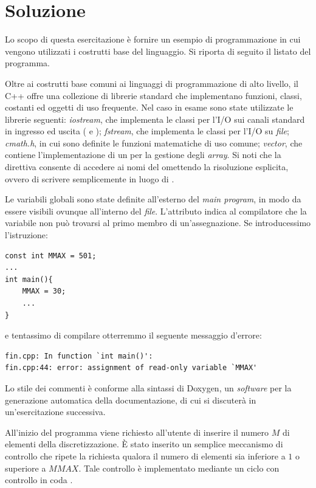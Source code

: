 \newpage
\section*{Soluzione}

Lo scopo di questa esercitazione \`e fornire un esempio di
programmazione in cui vengono utilizzati i costrutti base del
linguaggio. Si riporta di seguito il listato del programma.
\lstset{basicstyle=\scriptsize\sf}

\lstset{basicstyle=\sf}

Oltre ai costrutti base comuni ai linguaggi di programmazione di alto
livello, il C++ offre una collezione di librerie standard che
implementano funzioni, classi, costanti ed oggetti di uso
frequente. Nel caso in esame sono state utilizzate le librerie
seguenti: \emph{iostream}, che implementa le classi per l'I/O sui
canali standard in ingresso ed uscita ( e
); \emph{fstream}, che implementa le classi per
l'I/O su \emph{file}; \emph{cmath.h}, in cui sono definite le funzioni
matematiche di uso comune; \emph{vector}, che contiene
l'implementazione di un   per la
gestione degli \emph{array}. Si noti che la direttiva   consente di accedere ai nomi del 
 omettendo la risoluzione esplicita, ovvero di scrivere
semplicemente  in luogo di .

Le variabili globali sono state definite all'esterno del \emph{main
program}, in modo da essere visibili ovunque all'interno del
\emph{file}. L'attributo  indica al compilatore che la
variabile non pu\`o trovarsi al primo membro di un'assegnazione. Se
introducessimo l'istruzione: 
\lstset{basicstyle=\scriptsize\sf}
\begin{lstlisting}
const int MMAX = 501;
...
int main(){     
    MMAX = 30;
    ...
}
\end{lstlisting}
\lstset{basicstyle=\sf}
e tentassimo di compilare otterremmo il seguente messaggio d'errore:
\begin{verbatim}
fin.cpp: In function `int main()':
fin.cpp:44: error: assignment of read-only variable `MMAX'
\end{verbatim}
Lo stile dei commenti \`e conforme alla sintassi di Doxygen, un
\emph{software} per la generazione automatica della documentazione, di
cui si discuter\`a in un'esercitazione successiva.

All'inizio del programma viene richiesto all'utente di inserire il
numero $M$ di elementi della discretizzazione. \`E stato inserito un
semplice meccanismo di controllo che ripete la richiesta qualora il
numero di elementi sia inferiore a $1$ o superiore a $MMAX$. Tale
controllo \`e implementato mediante un ciclo con controllo in coda
.

